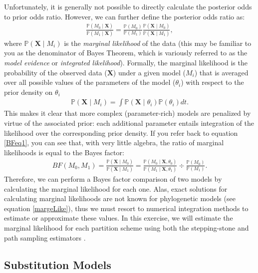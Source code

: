 Unfortunately, it is generally not possible to directly calculate the posterior odds to prior odds ratio. 
However, we can further define the posterior odds ratio as:
\begin{align*}
\frac{\mathbb{P}(M_0 \mid \mathbf X)}{\mathbb{P}(M_1 \mid \mathbf X)} = \frac{\mathbb{P}(M_0)}{\mathbb{P}(M_1)} \frac{\mathbb{P}(\mathbf X \mid M_0)}{\mathbb{P}(\mathbf X \mid M_1)},
\end{align*}
where $\mathbb{P}(\mathbf X \mid M_i)$ is the \textit{marginal likelihood} of the data (this may be familiar to you as the denominator of Bayes Theorem, which is variously referred to as the \textit{model evidence} or \textit{integrated likelihood}).
Formally, the marginal likelihood is the probability of the observed data ($\mathbf X$) under a given model ($M_i$) that is averaged over all possible values of the parameters of the model ($\theta_i$) with respect to the prior density on $\theta_i$
\begin{align}\label{margeLike}
\mathbb{P}(\mathbf X \mid M_i) = \int \mathbb{P}(\mathbf X \mid \theta_i) \mathbb{P}(\theta_i)dt.
\end{align}
This makes it clear that more complex (parameter-rich) models are penalized by virtue of the associated prior: each additional parameter entails integration of the likelihood over the corresponding prior density.  
If you refer back to equation \ref{BFeq1}, you can see that, with very little algebra, the ratio of marginal likelihoods is equal to the Bayes factor:
\begin{align}\label{bfFormula}
BF(M_0,M_1) = \frac{\mathbb{P}(\mathbf X \mid M_0)}{\mathbb{P}(\mathbf X \mid M_1)} = \frac{\mathbb{P}(M_0 \mid \mathbf X, \theta_0)}{\mathbb{P}(M_1 \mid \mathbf X, \theta_1)} \div \frac{\mathbb{P}(M_0)}{\mathbb{P}(M_1)}. 
\end{align}
Therefore, we can perform a Bayes factor comparison of two models by calculating the marginal likelihood for each one. %
Alas, exact solutions for calculating marginal likelihoods are not known for phylogenetic models (see equation \ref{margeLike}), thus we must resort to numerical integration methods to estimate or approximate these values. 
In this exercise, we will estimate the marginal likelihood for each partition scheme
using both the stepping-stone \citep{Xie2011,Fan2011} and path sampling estimators \citep{Lartillot2006, Baele2012}. 



\bigskip
\subsection{Substitution Models} 

